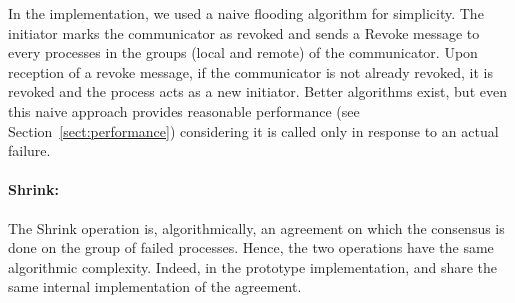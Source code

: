 In the \ulfm implementation, we used a naive flooding algorithm for simplicity.
The initiator marks the communicator as revoked and sends a Revoke message to
every processes in the groups (local and remote) of the communicator.  Upon
reception of a revoke message, if the communicator is not already revoked, it is
revoked and the process acts as a new initiator.
Better algorithms exist, but even this naive approach provides reasonable
performance (see Section~\ref{sect:performance}) considering it is called only
in response to an actual failure.

\paragraph*{Shrink:} The Shrink operation is, algorithmically, an agreement on
which the consensus is done on the group of failed processes.
Hence, the two operations have the same algorithmic complexity. Indeed, in the
prototype implementation,  and
 share the same internal implementation of the
agreement.
